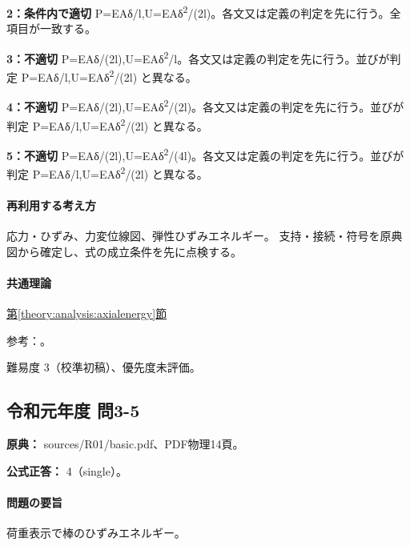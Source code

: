 \noindent\textbf{2：条件内で適切} P=\allowbreak{}EAδ/l,U=\allowbreak{}EAδ\textsuperscript{2}/(2l)。各文又は定義の判定を先に行う。全項目が一致する。\par

\noindent\textbf{3：不適切} P=\allowbreak{}EAδ/(2l),U=\allowbreak{}EAδ\textsuperscript{2}/l。各文又は定義の判定を先に行う。並びが判定 P=\allowbreak{}EAδ/l,U=\allowbreak{}EAδ\textsuperscript{2}/(2l) と異なる。\par

\noindent\textbf{4：不適切} P=\allowbreak{}EAδ/(2l),U=\allowbreak{}EAδ\textsuperscript{2}/(2l)。各文又は定義の判定を先に行う。並びが判定 P=\allowbreak{}EAδ/l,U=\allowbreak{}EAδ\textsuperscript{2}/(2l) と異なる。\par

\noindent\textbf{5：不適切} P=\allowbreak{}EAδ/(2l),U=\allowbreak{}EAδ\textsuperscript{2}/(4l)。各文又は定義の判定を先に行う。並びが判定 P=\allowbreak{}EAδ/l,U=\allowbreak{}EAδ\textsuperscript{2}/(2l) と異なる。\par

\paragraph{再利用する考え方} 応力・ひずみ、力変位線図、弾性ひずみエネルギー。 支持・接続・符号を原典図から確定し、式の成立条件を先に点検する。

\paragraph{共通理論} \hyperref[theory:analysis:axialenergy]{第\ref*{theory:analysis:axialenergy}節}

\par 参考：\cite{mit_material_elastic2000}。

\par 難易度 3（校準初稿）、優先度未評価。

\subsection{令和元年度 問3-5}
\label{q:r01-reg-basic-3-5}

\noindent\textbf{原典：} sources/R01/basic.pdf、PDF物理14頁。

\textbf{公式正答：} 4（single）。

\paragraph{問題の要旨} 荷重表示で棒のひずみエネルギー。

